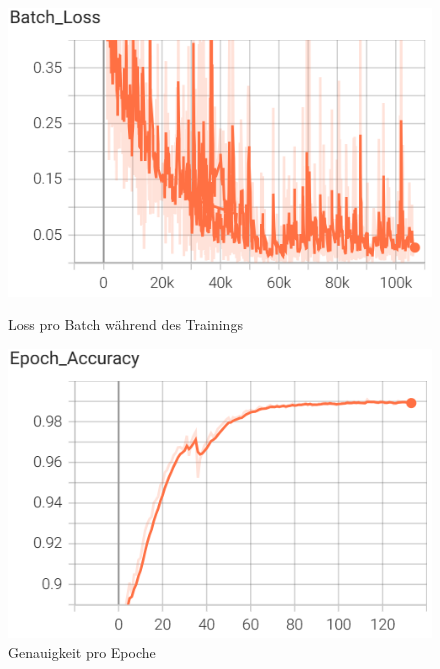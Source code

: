 \documentclass[11pt,a4paper]{article}
\begin{document}
\begin{figure}[H]
    \centering
    \begin{minipage}{0.48\textwidth}
        \includegraphics[width=\textwidth]{img/train/batch_loss.png}
        \caption{Loss pro Batch während des Trainings}
        \label{fig:batch_loss}
    \end{minipage}\hfill
    \begin{minipage}{0.48\textwidth}
        \includegraphics[width=\textwidth]{img/train/epoch_accuracy.png}
        \caption{Genauigkeit pro Epoche}
        \label{fig:epoch_accuracy}
    \end{minipage}
\end{figure}
\end{document}
